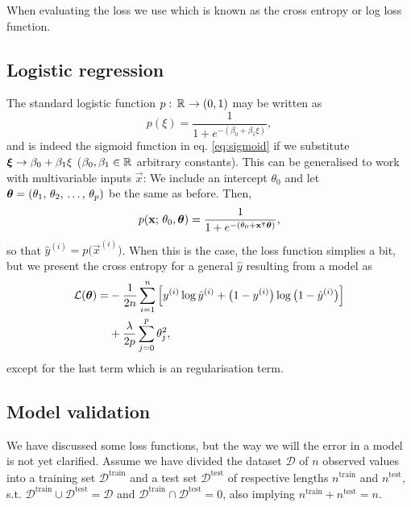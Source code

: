     When evaluating the loss we use   which is known as the cross entropy or log loss function. 

\subsection{Logistic regression}\label{sec:logistic_regression}

The standard logistic function $p:\, \mathbb{R}^{} \to (0,1)$ may be written as 
\begin{equation}\label{eq:logistic_function}
    p(\xi) = \frac{1}{1+e^{-(\beta_0 + \beta_1\xi)}},
\end{equation}
and is indeed the sigmoid function in eq. \eqref{eq:sigmoid} if we substitute $\boldsymbol{\xi} \to \beta_0 + \beta_1 \xi$ ($\beta_0, \beta_1 \in \mathbb{R}^{}$ arbitrary constants). This can be generalised to work with multivariable inputs $\vec{x}$: We include an intercept $\theta_0$ and let $\boldsymbol{\theta} = (\theta_1, \, \theta_2, \, \dots,\, \theta_p)$ be the same as before. Then,
\begin{equation}\label{eq:logistic_function_fit}
    p(\mathbf{x};\,\theta_0, \boldsymbol{\theta}) = \frac{1}{1+e^{-(\theta_0 + \mathbf{x}^\intercal \boldsymbol{\theta})}},
\end{equation}
so that $\hat{y}^{(i)} = p\big(\vec{x}^{(i)}\big)$. When this is the case, the loss function simplies a bit, but we present the cross entropy for a general $\hat{y}$ resulting from a model as
\begin{equation}\label{eq:logistic_regression_cost_function}
    \begin{split}
        \mathcal{L}(\boldsymbol{\theta}) =& -  \frac{1}{2n}\sum_{i=1}^n \Big[ y^{(i)} \log{\hat{y}^{(i)}} + \big(1-y^{(i)}\big) \log{\big(1-\hat{y}^{(i)}\big)}\Big] \\
        &+ \frac{\lambda}{2p}\sum_{j=0}^p \theta_j^2,
    \end{split}
\end{equation}
except for the last term which is an \lnorm[2] regularisation term.


\subsection{Model validation} %

We have discussed some loss functions, but the way we will  the error in a model is not yet clarified. Assume we have divided the dataset $\mathcal{D}$ of $n$ observed values into a training set $\mathcal{D}^\mathrm{train}$ and a test set $\mathcal{D}^\mathrm{test}$ of respective lengths $n^\mathrm{train}$ and $n^\mathrm{test}$, s.t. $ \mathcal{D}^\mathrm{train} \cup\mathcal{D}^\mathrm{test} = \mathcal{D}$ and $\mathcal{D}^\mathrm{train} \cap\mathcal{D}^\mathrm{test} = 0 $, also implying $n^\mathrm{train}+n^\mathrm{test}=n$.

